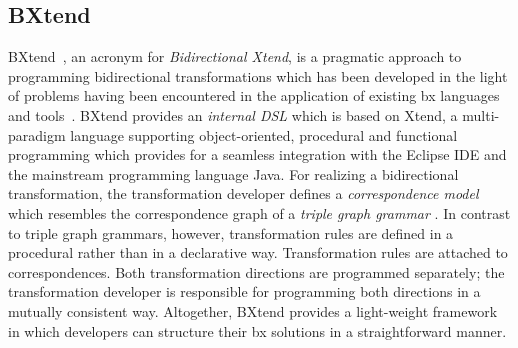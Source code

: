 \subsection{BXtend}
\label{sec:BXtend}



BXtend~\cite{MODELSWARD2018-Buchmann}, an acronym for \emph{Bidirectional Xtend}, is a pragmatic approach to programming bidirectional transformations which has been developed in the light of problems having been encountered in the application of existing bx languages and tools~\cite{DBLP:conf/icsoft/BuchmannG16}. BXtend provides an \emph{internal DSL} which is based on Xtend, a multi-paradigm language supporting object-oriented, procedural and functional programming which provides for a seamless integration with the Eclipse IDE and the mainstream programming language Java. For realizing a bidirectional transformation, the transformation developer defines a \emph{correspondence model} which resembles the correspondence graph of a \emph{triple graph grammar} \cite{Schurr1994}. In contrast to triple graph grammars, however, transformation rules are defined in a procedural rather than in a declarative way. Transformation rules are attached to correspondences. Both transformation directions are programmed separately; the transformation developer is responsible for programming both directions in a mutually consistent way. Altogether, BXtend provides a light-weight framework in which developers can structure their bx solutions in a straightforward manner.
%

